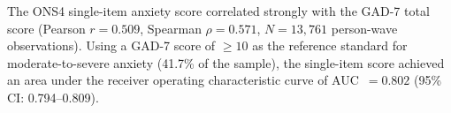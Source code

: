 The ONS4 single-item anxiety score correlated strongly with the GAD-7 total score (Pearson $r = 0.509$, Spearman $\rho = 0.571$, $N = 13{,}761$ person-wave observations). Using a GAD-7 score of $\geq 10$ as the reference standard for moderate-to-severe anxiety (41.7\% of the sample), the single-item score achieved an area under the receiver operating characteristic curve of AUC~$= 0.802$ (95\% CI: 0.794--0.809).